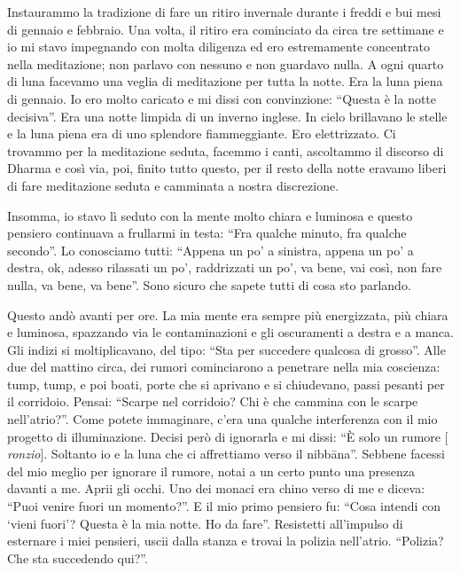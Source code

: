 Instaurammo la tradizione di fare un ritiro invernale durante i freddi e bui mesi di gennaio e febbraio. Una volta, il ritiro era cominciato da circa tre settimane e io mi stavo impegnando con molta diligenza ed ero estremamente concentrato nella meditazione; non parlavo con nessuno e non guardavo nulla. A ogni quarto di luna facevamo una veglia di meditazione per tutta la notte. Era la luna piena di gennaio. Io ero molto caricato e mi dissi con convinzione: ``Questa è la notte decisiva''. Era una notte limpida di un inverno inglese. In cielo brillavano le stelle e la luna piena era di uno splendore fiammeggiante. Ero elettrizzato. Ci trovammo per la meditazione seduta, facemmo i canti, ascoltammo il discorso di Dharma e così via, poi, finito tutto questo, per il resto della notte eravamo liberi di fare meditazione seduta e camminata a nostra discrezione.

Insomma, io stavo lì seduto con la mente molto chiara e luminosa e questo pensiero continuava a frullarmi in testa: ``Fra qualche minuto, fra qualche secondo''. Lo conosciamo tutti: ``Appena un po' a sinistra, appena un po' a destra, ok, adesso rilassati un po', raddrizzati un po', va bene, vai così, non fare nulla, va bene, va bene''. Sono sicuro che sapete tutti di cosa sto parlando.

Questo andò avanti per ore. La mia mente era sempre più energizzata, più chiara e luminosa, spazzando via le contaminazioni e gli oscuramenti a destra e a manca. Gli indizi si moltiplicavano, del tipo: ``Sta per succedere qualcosa di grosso''. Alle due del mattino circa, dei rumori cominciarono a penetrare nella mia coscienza: tump, tump, e poi boati, porte che si aprivano e si chiudevano, passi pesanti per il corridoio. Pensai: ``Scarpe nel corridoio? Chi è che cammina con le scarpe nell'atrio?''. Come potete immaginare, c'era una qualche interferenza con il mio progetto di illuminazione. Decisi però di ignorarla e mi dissi: ``È solo un rumore $[$\textit{ronzio}$]$. Soltanto io e la luna che ci affrettiamo verso il nibbāna''. Sebbene facessi del mio meglio per ignorare il rumore, notai a un certo punto una presenza davanti a me. Aprii gli occhi. Uno dei monaci era chino verso di me e diceva: ``Puoi venire fuori un momento?''. E il mio primo pensiero fu: ``Cosa intendi con `vieni fuori'? Questa è la mia notte. Ho da fare''. Resistetti all'impulso di esternare i miei pensieri, uscii dalla stanza e trovai la polizia nell'atrio. ``Polizia? Che sta succedendo qui?''.

